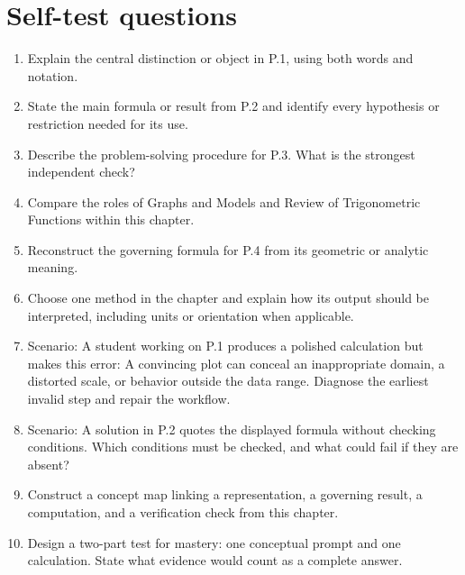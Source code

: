 \documentclass[11pt]{article}
\begin{document}
\section{Self-test questions}
\begin{enumerate}
\item Explain the central distinction or object in P.1, using both words and notation.
\item State the main formula or result from P.2 and identify every hypothesis or restriction needed for its use.
\item Describe the problem-solving procedure for P.3. What is the strongest independent check?
\item Compare the roles of Graphs and Models and Review of Trigonometric Functions within this chapter.
\item Reconstruct the governing formula for P.4 from its geometric or analytic meaning.
\item Choose one method in the chapter and explain how its output should be interpreted, including units or orientation when applicable.
\item Scenario: A student working on P.1 produces a polished calculation but makes this error: A convincing plot can conceal an inappropriate domain, a distorted scale, or behavior outside the data range. Diagnose the earliest invalid step and repair the workflow.
\item Scenario: A solution in P.2 quotes the displayed formula without checking conditions. Which conditions must be checked, and what could fail if they are absent?
\item Construct a concept map linking a representation, a governing result, a computation, and a verification check from this chapter.
\item Design a two-part test for mastery: one conceptual prompt and one calculation. State what evidence would count as a complete answer.
\end{enumerate}

\end{document}
